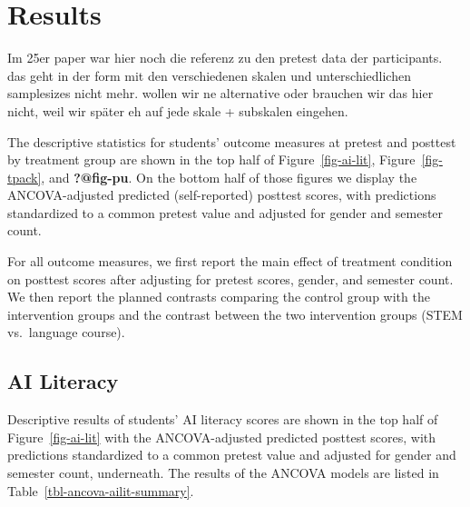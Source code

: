 \documentclass[
  letterpaper,
  DIV=11,
  numbers=noendperiod]{scrartcl}
\begin{document}
\section{Results}\label{results}

\begin{tcolorbox}[enhanced jigsaw, breakable, colback=white, opacitybacktitle=0.6, colbacktitle=quarto-callout-note-color!10!white, leftrule=.75mm, colframe=quarto-callout-note-color-frame, toprule=.15mm, opacityback=0, coltitle=black, bottomrule=.15mm, bottomtitle=1mm, toptitle=1mm, titlerule=0mm, title=\textcolor{quarto-callout-note-color}{\faInfo}\hspace{0.5em}{Note}, arc=.35mm, rightrule=.15mm, left=2mm]

Im 25er paper war hier noch die referenz zu den pretest data der
participants. das geht in der form mit den verschiedenen skalen und
unterschiedlichen samplesizes nicht mehr. wollen wir ne alternative oder
brauchen wir das hier nicht, weil wir später eh auf jede skale +
subskalen eingehen.

\end{tcolorbox}

The descriptive statistics for students' outcome measures at pretest and
posttest by treatment group are shown in the top half of
Figure~\ref{fig-ai-lit}, Figure~\ref{fig-tpack}, and \textbf{?@fig-pu}.
On the bottom half of those figures we display the ANCOVA-adjusted
predicted (self-reported) posttest scores, with predictions standardized
to a common pretest value and adjusted for gender and semester count.

For all outcome measures, we first report the main effect of treatment
condition on posttest scores after adjusting for pretest scores, gender,
and semester count. We then report the planned contrasts comparing the
control group with the intervention groups and the contrast between the
two intervention groups (STEM vs.~language course).

\subsection{AI Literacy}\label{ai-literacy}

Descriptive results of students' AI literacy scores are shown in the top
half of Figure~\ref{fig-ai-lit} with the ANCOVA-adjusted predicted
posttest scores, with predictions standardized to a common pretest value
and adjusted for gender and semester count, underneath. The results of
the ANCOVA models are listed in Table~\ref{tbl-ancova-ailit-summary}.
\end{document}
